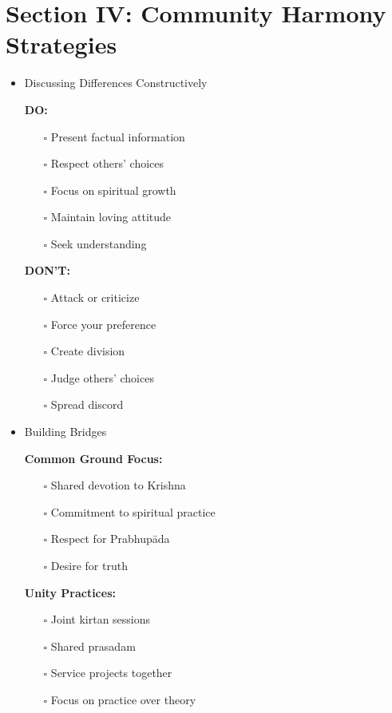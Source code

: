 \documentclass[11pt,twoside]{book}
\begin{document}
\section*{Section IV: Community Harmony Strategies}
\label{sec:org3510c63}

\begin{itemize}
\item Discussing Differences Constructively
\label{sec:orga27e205}

\textbf{\textbf{DO:}}
\begin{itemize}
\item[{$\square$}] Present factual information
\item[{$\square$}] Respect others' choices
\item[{$\square$}] Focus on spiritual growth
\item[{$\square$}] Maintain loving attitude
\item[{$\square$}] Seek understanding
\end{itemize}

\textbf{\textbf{DON'T:}}
\begin{itemize}
\item[{$\square$}] Attack or criticize
\item[{$\square$}] Force your preference
\item[{$\square$}] Create division
\item[{$\square$}] Judge others' choices
\item[{$\square$}] Spread discord
\end{itemize}
\item Building Bridges
\label{sec:org4f4e0eb}

\textbf{\textbf{Common Ground Focus:}}
\begin{itemize}
\item[{$\square$}] Shared devotion to Krishna
\item[{$\square$}] Commitment to spiritual practice
\item[{$\square$}] Respect for Prabhupāda
\item[{$\square$}] Desire for truth
\end{itemize}

\textbf{\textbf{Unity Practices:}}
\begin{itemize}
\item[{$\square$}] Joint kirtan sessions
\item[{$\square$}] Shared prasadam
\item[{$\square$}] Service projects together
\item[{$\square$}] Focus on practice over theory
\end{itemize}
\end{itemize}
\end{document}

